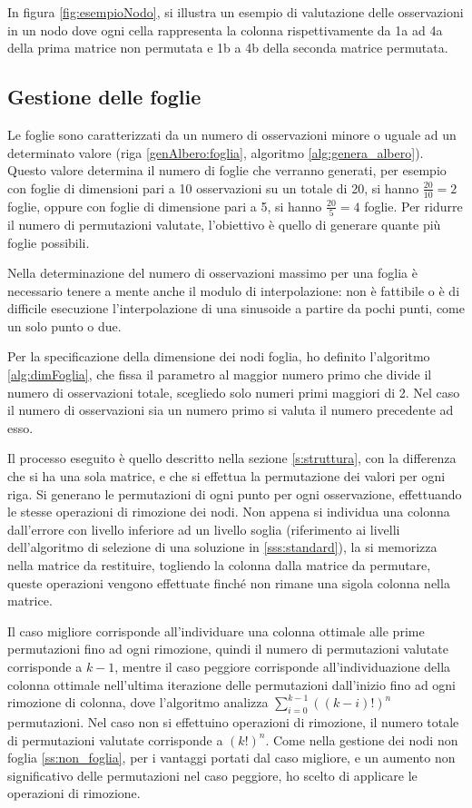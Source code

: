 \documentclass[a4paper,12pt]{report}
\begin{document}
    In figura \ref{fig:esempioNodo}, si illustra un esempio di valutazione delle osservazioni in un nodo dove ogni cella rappresenta la colonna rispettivamente da 1a ad 4a della prima matrice non permutata e 1b a 4b della seconda matrice permutata.

  \subsection{Gestione delle foglie}
  Le foglie sono caratterizzati da un numero di osservazioni minore o uguale ad un determinato valore (riga \ref{genAlbero:foglia}, algoritmo \ref{alg:genera_albero}). Questo valore determina il numero di foglie che verranno generati, per esempio con foglie di dimensioni pari a 10 osservazioni su un totale di 20, si hanno $\frac{20}{10} = 2$ foglie, oppure con foglie di dimensione pari a 5, si hanno $\frac{20}{5} = 4$ foglie. Per ridurre il numero di permutazioni valutate, l'obiettivo è quello di generare quante più foglie possibili.

  Nella determinazione del numero di osservazioni massimo per una foglia è necessario tenere a mente anche il modulo di interpolazione: non è fattibile o è di difficile esecuzione l'interpolazione di una sinusoide a partire da pochi punti, come un solo punto o due.

  Per la specificazione della dimensione dei nodi foglia, ho definito l'algoritmo \ref{alg:dimFoglia}, che fissa il parametro al maggior numero primo che divide il numero di osservazioni totale, scegliedo solo numeri primi maggiori di 2. Nel caso il numero di osservazioni sia un numero primo si valuta il numero precedente ad esso.

  Il processo eseguito è quello descritto nella sezione \ref{s:struttura}, con la differenza che si ha una sola matrice, e che si effettua la permutazione dei valori per ogni riga.
  Si generano le permutazioni di ogni punto per ogni osservazione, effettuando le stesse operazioni di rimozione dei nodi. Non appena si individua una colonna dall'errore con livello inferiore ad un livello soglia (riferimento ai livelli dell'algoritmo di selezione di una soluzione in \ref{sss:standard}), la si memorizza nella matrice da restituire, togliendo la colonna dalla matrice da permutare, queste operazioni vengono effettuate finché non rimane una sigola colonna nella matrice.

  Il caso migliore corrisponde all'individuare una colonna ottimale alle prime permutazioni fino ad ogni rimozione, quindi il numero di permutazioni valutate corrisponde a $k-1$, mentre il caso peggiore corrisponde all'individuazione della colonna ottimale nell'ultima iterazione delle permutazioni dall'inizio fino ad ogni rimozione di colonna, dove l'algoritmo analizza  $\sum_{i=0}^{k-1} ((k-i)!)^n$ permutazioni. Nel caso non si effettuino operazioni di rimozione, il numero totale di permutazioni valutate corrisponde a $(k!)^n$. Come nella gestione dei nodi non foglia \ref{ss:non_foglia},
  per i vantaggi portati dal caso migliore, e un aumento non significativo delle permutazioni nel caso peggiore, ho scelto di applicare le operazioni di rimozione.
\end{document}
